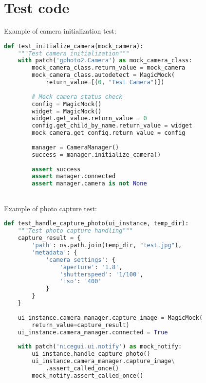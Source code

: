 \section{Test code}
Example of camera initialization test:
\begin{lstlisting}[language=Python]
def test_initialize_camera(mock_camera):
    """Test camera initialization"""
    with patch('gphoto2.Camera') as mock_camera_class:
        mock_camera_class.return_value = mock_camera
        mock_camera_class.autodetect = MagicMock(
            return_value=[(0, "Test Camera")])
        
        # Mock camera status check
        config = MagicMock()
        widget = MagicMock()
        widget.get_value.return_value = 0
        config.get_child_by_name.return_value = widget
        mock_camera.get_config.return_value = config
        
        manager = CameraManager()
        success = manager.initialize_camera()
        
        assert success
        assert manager.connected
        assert manager.camera is not None
\end{lstlisting}
\\
Example of photo capture test:
\begin{lstlisting}[language=Python]
def test_handle_capture_photo(ui_instance, temp_dir):
    """Test photo capture handling"""
    capture_result = {
        'path': os.path.join(temp_dir, "test.jpg"),
        'metadata': {
            'camera_settings': {
                'aperture': '1.8',
                'shutterspeed': '1/100',
                'iso': '400'
            }
        }
    }
    
    ui_instance.camera_manager.capture_image = MagicMock(
        return_value=capture_result)
    ui_instance.camera_manager.connected = True
    
    with patch('nicegui.ui.notify') as mock_notify:
        ui_instance.handle_capture_photo()
        ui_instance.camera_manager.capture_image\
            .assert_called_once()
        mock_notify.assert_called_once()
\end{lstlisting}


